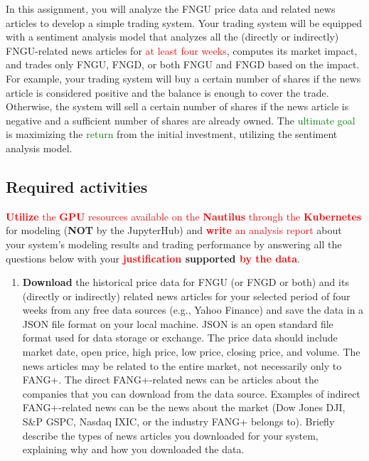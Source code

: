 \documentclass[twocolumn,12pt]{article}
\begin{document}
\begin{flushleft}
In this assignment, you will analyze the FNGU price data and related news articles to develop a simple trading system. Your trading system will be equipped with a sentiment analysis model that analyzes all the (directly or indirectly) FNGU-related news articles for \textcolor{red}{at least four weeks}, computes its market impact, and trades only FNGU, FNGD, or both FNGU and FNGD based on the impact. For example, your trading system will buy a certain number of shares if the news article is considered positive and the balance is enough to cover the trade. Otherwise, the system will sell a certain number of shares if the news article is negative and a sufficient number of shares are already owned. The \textcolor{green}{ultimate goal} is maximizing the \textcolor{green}{return} from the initial investment, utilizing the sentiment analysis model.

\subsection*{Required activities}
\textcolor{red}{\textbf{Utilize} the \textbf{GPU} resources available on the \textbf{Nautilus} through the \textbf{Kubernetes}} for modeling (\textbf{NOT} by the JupyterHub) and \textcolor{red}{\textbf{write} an analysis report} about your system's modeling results and trading performance by answering all the questions below with your \textbf{\textcolor{red}{justification} supported \textcolor{red}{by the data}}.

\begin{enumerate}
	\item \textbf{Download} the historical price data for FNGU (or FNGD or both) and its (directly or indirectly) related news articles for your selected period of four weeks from any free data sources (e.g., Yahoo Finance) and save the data in a JSON file format on your local machine. JSON is an open standard file format used for data storage or exchange. The price data should include market date, open price, high price, low price, closing price, and volume. The news articles may be related to the entire market, not necessarily only to FANG+. The direct FANG+-related news can be articles about the companies that you can download from the data source. Examples of indirect FANG+-related news can be the news about the market (Dow Jones \scalebox{.8}{\textsuperscript{$\wedge$}}DJI, S\&P \scalebox{.8}{\textsuperscript{$\wedge$}}GSPC, Nasdaq \scalebox{.8}{\textsuperscript{$\wedge$}}IXIC, or the industry FANG+ belongs to). Briefly describe the types of news articles you downloaded for your system, explaining why and how you downloaded the data.\\
	

\end{enumerate}
\end{flushleft}
\end{document}
